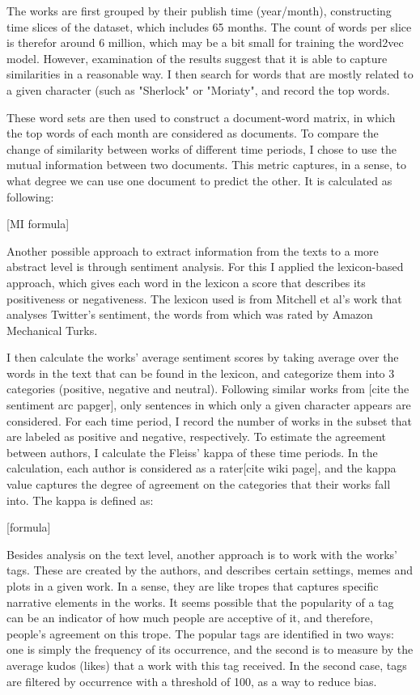 \documentclass{pnastwo}
\begin{document}
\begin{article}
The works are first grouped by their publish time (year/month), constructing time slices of the dataset, which includes 65 months. The count of words per slice is therefor around 6 million, which may be a bit small for training the word2vec model. However, examination of the results suggest that it is able to capture similarities in a reasonable way. I then search for words that are mostly related to a given character (such as "Sherlock" or "Moriaty", and record the top words. 

These word sets are then used to construct a document-word matrix, in which the top words of each month are considered as documents. To compare the change of similarity between works of different time periods, I chose to use the mutual information between two documents. This metric captures, in a sense, to what degree we can use one document to predict the other. It is calculated as following:

[MI formula]

Another possible approach to extract information from the texts to a more abstract level is through sentiment analysis. For this I applied the lexicon-based approach, which gives each word in the lexicon a score that describes its positiveness or negativeness. The lexicon used is from Mitchell et al's work that analyses Twitter's 
sentiment, the words from which was rated by Amazon Mechanical Turks. 

I then calculate the works' average sentiment scores by taking average over the words in the text that can be found in the lexicon, and categorize them into 3 categories (positive, negative and neutral). Following similar works from [cite the sentiment arc papger], only sentences in which only a given character appears are considered.  For each time period, I record the number of works in the subset that are labeled as positive and negative, respectively. To estimate the agreement between authors, I calculate the Fleiss' kappa of these time periods. In the calculation, each author is considered as a rater[cite wiki page], and the kappa value captures the degree of agreement on the categories that their works fall into. The kappa is defined as:

[formula]

Besides analysis on the text level, another approach is to work with the works' tags. These are created by the authors, and describes certain settings, memes and plots in a given work. In a sense, they are like tropes that captures specific narrative elements in the works.  It seems possible that the popularity of a tag can be an indicator of how much people are acceptive of it, and therefore, people's agreement on this trope. The popular tags are identified in two ways: one is simply the frequency of its occurrence, and the second is to measure by the average kudos (likes) that a work with this tag received. In the second case, tags are filtered by occurrence with a threshold of 100, as a way to reduce bias. 





\end{article}
\end{document}
